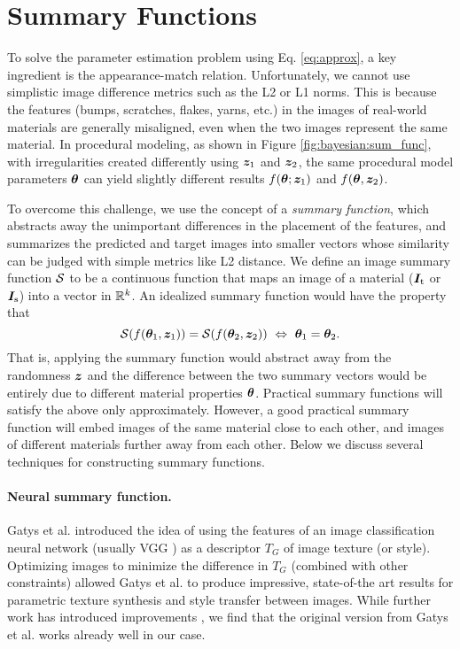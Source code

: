 \section{Summary Functions}
\label{sec:bayesian:summary}

To solve the parameter estimation problem using Eq. \eqref{eq:approx}, a key ingredient is the appearance-match relation.
Unfortunately, we cannot use simplistic image difference metrics such as the L2 or L1 norms.
This is because the features (bumps, scratches, flakes, yarns, etc.) in the images of real-world materials are generally misaligned, even when the two images represent the same material.
In procedural modeling, as shown in Figure \ref{fig:bayesian:sum_func}, with irregularities created differently using $\bm{z}_1$ and $\bm{z}_2$, the same procedural model parameters $\bm\theta$ can yield slightly different results $f(\bm\theta; \bm{z}_1)$ and $f(\bm\theta, \bm{z}_2)$.



To overcome this challenge, we use the concept of a \emph{summary function}, which abstracts away the unimportant differences in the placement of the features, and summarizes the predicted and target images into smaller vectors whose similarity can be judged with simple metrics like L2 distance.
We define an image summary function $\mathcal{S}$ to be a continuous function that maps an image of a material ($\bm{I}_\mathrm{t}$ or $\bm{I}_\mathrm{s}$) into a vector in $\mathbb{R}^k$. An idealized summary function would have the property that
\begin{equation}
	\mathcal{S}(f(\bm\theta_1, \bm{z}_1)) = \mathcal{S}(f(\bm\theta_2, \bm{z}_2)) \ \Leftrightarrow \ \bm\theta_1 = \bm\theta_2.
\end{equation}
That is, applying the summary function would abstract away from the randomness $\bm{z}$ and the difference between the two summary vectors would be entirely due to different material properties $\bm\theta$. Practical summary functions will satisfy the above only approximately. However, a good practical summary function will embed images of the same material close to each other, and images of different materials further away from each other. Below we discuss several techniques for constructing summary functions.

\paragraph{Neural summary function.}
Gatys et al. \cite{gatys2015neural,gatys2016image} introduced the idea of using the features of an image classification neural network (usually VGG \cite{simonyan2014very}) as a descriptor $T_G$ of image texture (or style). Optimizing images to minimize the difference in $T_G$ (combined with other constraints) allowed Gatys et al. to produce impressive, state-of-the art results for parametric texture synthesis and style transfer between images. While further work  has introduced improvements \cite{risser2017stable}, we find that the original version from Gatys et al. works already well in our case.

